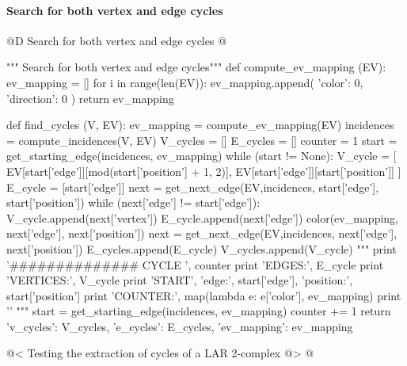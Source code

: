 \documentclass[11pt,oneside]{article}    %
\begin{document}
\paragraph{Search for both vertex and edge cycles}
@D Search for both vertex and edge cycles
@{""" Search for both vertex and edge cycles"""
def compute_ev_mapping (EV):
    ev_mapping = []
    for i in range(len(EV)):
        ev_mapping.append({ 'color': 0, 'direction': 0 })
    return ev_mapping

def find_cycles (V, EV):
    ev_mapping = compute_ev_mapping(EV)
    incidences = compute_incidences(V, EV)
    V_cycles = []
    E_cycles = []
    counter = 1
    start = get_starting_edge(incidences, ev_mapping)
    while (start != None):
        V_cycle = [ EV[start['edge']][mod(start['position'] + 1, 2)], 
                    EV[start['edge']][start['position']] ]
        E_cycle = [start['edge']]
        next = get_next_edge(EV,incidences, start['edge'], start['position'])
        while (next['edge'] != start['edge']):
            V_cycle.append(next['vertex'])
            E_cycle.append(next['edge'])
            color(ev_mapping, next['edge'], next['position'])
            next = get_next_edge(EV,incidences, next['edge'], next['position'])
        E_cycles.append(E_cycle)
        V_cycles.append(V_cycle)
        """
        print '############## CYCLE ', counter
        print 'EDGES:', E_cycle
        print 'VERTICES:', V_cycle
        print 'START', 'edge:', start['edge'], 'position:', start['position']
        print 'COUNTER:', map(lambda e: e['color'], ev_mapping)
        print '\n'
        """
        start = get_starting_edge(incidences, ev_mapping)
        counter += 1
    return {
        'v_cycles': V_cycles,
        'e_cycles': E_cycles,
        'ev_mapping': ev_mapping }
        
@< Testing the extraction of cycles of a LAR 2-complex @>
@}
\end{document}
